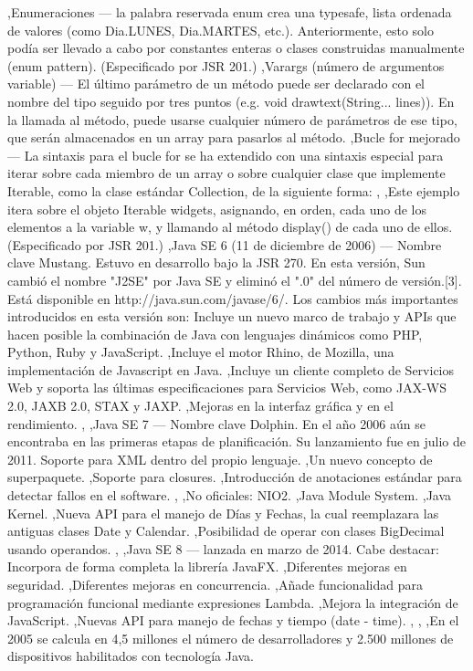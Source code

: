 \documentclass[11pt,a4paper]{$type}
\begin{document}
	\bigskip
							,Enumeraciones — la palabra reservada enum crea una typesafe, lista ordenada de valores (como Dia.LUNES, Dia.MARTES, etc.). Anteriormente, esto solo podía ser llevado a cabo por constantes enteras o clases construidas manualmente (enum pattern). (Especificado por JSR 201.)
	\bigskip
							,Varargs (número de argumentos variable) — El último parámetro de un método puede ser declarado con el nombre del tipo seguido por tres puntos (e.g. void drawtext(String... lines)). En la llamada al método, puede usarse cualquier número de parámetros de ese tipo, que serán almacenados en un array para pasarlos al método.
	\bigskip
							,Bucle for mejorado — La sintaxis para el bucle for se ha extendido con una sintaxis especial para iterar sobre cada miembro de un array o sobre cualquier clase que implemente Iterable, como la clase estándar Collection, de la siguiente forma:
	\bigskip
							,
	\bigskip
							,Este ejemplo itera sobre el objeto Iterable widgets, asignando, en orden, cada uno de los elementos a la variable w, y llamando al método display() de cada uno de ellos. (Especificado por JSR 201.)
	\bigskip
							,Java SE 6 (11 de diciembre de 2006) — Nombre clave Mustang. Estuvo en desarrollo bajo la JSR 270. En esta versión, Sun cambió el nombre "J2SE" por Java SE y eliminó el ".0" del número de versión.[3]. Está disponible en http://java.sun.com/javase/6/. Los cambios más importantes introducidos en esta versión son: Incluye un nuevo marco de trabajo y APIs que hacen posible la combinación de Java con lenguajes dinámicos como PHP, Python, Ruby y JavaScript.
	\bigskip
							,Incluye el motor Rhino, de Mozilla, una implementación de Javascript en Java.
	\bigskip
							,Incluye un cliente completo de Servicios Web y soporta las últimas especificaciones para Servicios Web, como JAX-WS 2.0, JAXB 2.0, STAX y JAXP.
	\bigskip
							,Mejoras en la interfaz gráfica y en el rendimiento.
	\bigskip
							,
	\bigskip
							,Java SE 7 — Nombre clave Dolphin. En el año 2006 aún se encontraba en las primeras etapas de planificación. Su lanzamiento fue en julio de 2011. Soporte para XML dentro del propio lenguaje.
	\bigskip
							,Un nuevo concepto de superpaquete.
	\bigskip
							,Soporte para closures.
	\bigskip
							,Introducción de anotaciones estándar para detectar fallos en el software.
	\bigskip
							,
	\bigskip
							,No oficiales: NIO2.
	\bigskip
							,Java Module System.
	\bigskip
							,Java Kernel.
	\bigskip
							,Nueva API para el manejo de Días y Fechas, la cual reemplazara las antiguas clases Date y Calendar.
	\bigskip
							,Posibilidad de operar con clases BigDecimal usando operandos.
	\bigskip
							,
	\bigskip
							,Java SE 8 — lanzada en marzo de 2014. Cabe destacar: Incorpora de forma completa la librería JavaFX.
	\bigskip
							,Diferentes mejoras en seguridad.
	\bigskip
							,Diferentes mejoras en concurrencia.
	\bigskip
							,Añade funcionalidad para programación funcional mediante expresiones Lambda.
	\bigskip
							,Mejora la integración de JavaScript.
	\bigskip
							,Nuevas API para manejo de fechas y tiempo (date - time).
	\bigskip
							,
	\bigskip
							,
	\bigskip
							,En el 2005 se calcula en 4,5 millones el número de desarrolladores y 2.500 millones de dispositivos habilitados con tecnología Java.
	\bigskip
			
\end{document}
